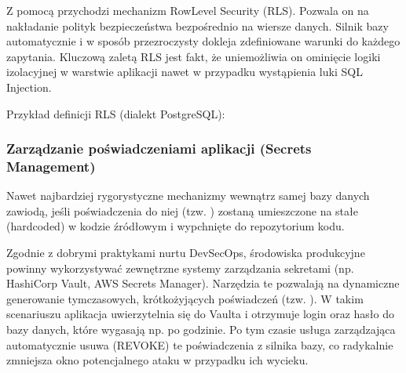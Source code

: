 \documentclass[letterpaper,10pt,polish]{sphinxmanual}
\begin{document}
\sphinxAtStartPar
Z pomocą przychodzi mechanizm Row\sphinxhyphen{}Level Security (RLS). Pozwala on na nakładanie polityk bezpieczeństwa bezpośrednio na wiersze danych. Silnik bazy automatycznie i w sposób przezroczysty dokleja zdefiniowane warunki do każdego zapytania. Kluczową zaletą RLS jest fakt, że uniemożliwia on ominięcie logiki izolacyjnej w warstwie aplikacji \textendash{} nawet w przypadku wystąpienia luki SQL Injection.

\sphinxAtStartPar
Przykład definicji RLS (dialekt PostgreSQL):

\begin{sphinxVerbatim}[commandchars=\\\{\}]

\end{sphinxVerbatim}


\subsubsection{Zarządzanie poświadczeniami aplikacji (Secrets Management)}
\label{\detokenize{rozdzia_u0142_2/rozdzia_u0142_27/rozdzial_3:zarzadzanie-poswiadczeniami-aplikacji-secrets-management}}
\sphinxAtStartPar
Nawet najbardziej rygorystyczne mechanizmy wewnątrz samej bazy danych zawiodą, jeśli poświadczenia do niej (tzw. ) zostaną umieszczone na stałe (hardcoded) w kodzie źródłowym i wypchnięte do repozytorium kodu.

\sphinxAtStartPar
Zgodnie z dobrymi praktykami nurtu DevSecOps, środowiska produkcyjne powinny wykorzystywać zewnętrzne systemy zarządzania sekretami (np. HashiCorp Vault, AWS Secrets Manager). Narzędzia te pozwalają na dynamiczne generowanie tymczasowych, krótkożyjących poświadczeń (tzw. ). W takim scenariuszu aplikacja uwierzytelnia się do Vaulta i otrzymuje login oraz hasło do bazy danych, które wygasają np. po godzinie. Po tym czasie usługa zarządzająca automatycznie usuwa (REVOKE) te poświadczenia z silnika bazy, co radykalnie zmniejsza okno potencjalnego ataku w przypadku ich wycieku.
\end{document}
